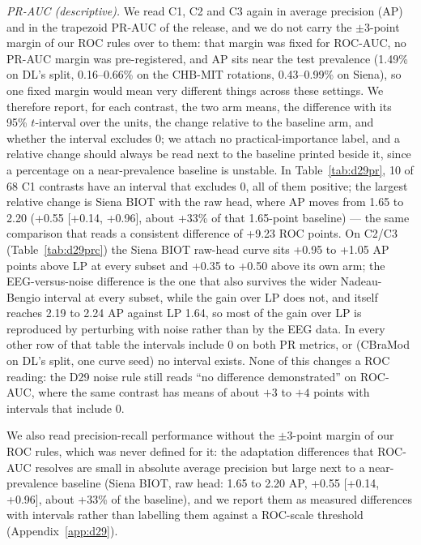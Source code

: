 \emph{PR-AUC (descriptive).} We read C1, C2 and C3 again in average precision (AP) and in the trapezoid
PR-AUC of the release, and we do not carry the $\pm3$-point margin of our ROC rules over to them: that
margin was fixed for ROC-AUC, no PR-AUC margin was pre-registered, and AP sits near the test prevalence
(1.49\% on DL's split, 0.16--0.66\% on the CHB-MIT rotations, 0.43--0.99\% on Siena), so one fixed
margin would mean very different things across these settings. We therefore report, for each contrast,
the two arm means, the difference with its 95\% $t$-interval over the units, the change relative to the
baseline arm, and whether the interval excludes 0; we attach no practical-importance label, and a
relative change should always be read next to the baseline printed beside it, since a percentage on a
near-prevalence baseline is unstable. In Table~\ref{tab:d29pr}, 10 of 68 C1 contrasts
have an interval that excludes 0, all of them positive; the largest relative change is Siena BIOT with
the raw head, where AP moves from 1.65 to 2.20 (+0.55
[+0.14, +0.96], about +33\% of that 1.65-point baseline) --- the same
comparison that reads a consistent difference of +9.23 ROC points. On C2/C3
(Table~\ref{tab:d29prc}) the Siena BIOT raw-head curve sits +0.95 to +1.05 AP
points above LP at every subset and +0.35 to +0.50 above its own \lastnoise{} arm; the EEG-versus-noise
difference is the one that also survives the wider Nadeau-Bengio interval at every subset, while the
gain over LP does not, and \lastnoise{} itself reaches 2.19 to
2.24 AP against LP 1.64, so most of the gain over LP
is reproduced by perturbing with noise rather than by the EEG data. In every other row of that table
the intervals include 0 on both PR metrics, or (CBraMod on DL's split, one curve seed) no interval
exists. None of this changes a ROC reading: the D29 noise rule
still reads ``no difference demonstrated'' on ROC-AUC, where the same contrast has means of about $+3$
to $+4$ points with intervals that include 0.

We also read precision-recall performance without the $\pm3$-point margin of our ROC rules, which was
never defined for it: the adaptation differences that ROC-AUC resolves are small in absolute average
precision but large next to a near-prevalence baseline (Siena BIOT, raw head: 1.65 to
2.20 AP, +0.55 [+0.14, +0.96], about +33\% of the
\lparm{} baseline), and we report them as measured differences with intervals rather than labelling
them against a ROC-scale threshold (Appendix~\ref{app:d29}).

